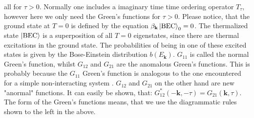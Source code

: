 all for $\tau > 0$. Normally one includes a imaginary time time ordering operator $T_\tau$, however here we only need the Green's functions for $\tau > 0$. Please notice, that the ground state at $T=0$ is defined by the equation $\beta_\mathbf{k}\ket{\text{BEC}}_0 = 0$. The thermalized state $\ket{\text{BEC}}$ is a superposition of all $T=0$ eigenstates, since there are thermal excitations in the ground state. The probabilities of being in one of these excited states is given by the Bose-Einstein distribution $b(E_\mathbf{k})$. $G_{11}$ is called the normal Green's function, whilst $G_{12}$ and $G_{21}$ are the anomalous Green's functions. This is probably because the $G_{11}$ Green's function is analogous to the one encountered for a simple non-interacting system \cite{BruusFlensberg}. $G_{12}$ and $G_{21}$ on the other hand are new "anormal" functions. It can easily be shown, that: $G_{12}^*(-\mathbf{k},-\tau) = G_{21}(\mathbf{k},\tau)$. The form of the Green's functions means, that we use the diagrammatic rules shown to the left in the above.

